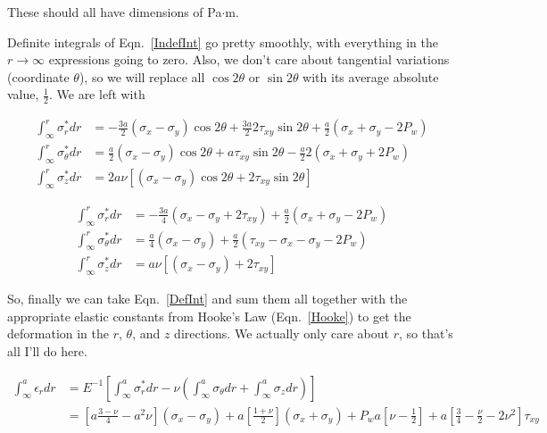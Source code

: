 \documentclass[11pt]{article}
\begin{document}
\noindent These should all have dimensions of Pa$\cdot$m.

Definite integrals of Eqn.~\ref{IndefInt} go pretty smoothly, with everything in the $r\rightarrow\infty$ expressions going to zero.  Also, we don't care about tangential variations (coordinate $\theta$), so we will replace all $\cos2\theta$ or $\sin2\theta$ with its average absolute value, $\frac{1}{2}$.  We are left with

\begin{equation}
	\begin{aligned}
	\int_\infty^r \sigma^*_r dr &= -\frac{3a}{2}\left(\sigma_x-\sigma_y\right)\cos2\theta + \frac{3a}{2}2\tau_{xy}\sin2\theta+\frac{a}{2}\left(\sigma_x+\sigma_y-2P_w\right) \\
	\int_\infty^r \sigma^*_\theta dr &= \frac{a}{2}\left(\sigma_x-\sigma_y\right)\cos2\theta+a\tau_{xy}\sin2\theta-\frac{a}{2}2\left(\sigma_x+\sigma_y+2P_w\right) \\
	\int_\infty^r \sigma^*_z dr &= 2a\nu\left[\left(\sigma_x-\sigma_y\right)\cos2\theta+2\tau_{xy}\sin2\theta\right]
	\end{aligned}
\label{DefInt}
\end{equation}
\fi%

\begin{equation}
	\begin{aligned}
	\int_\infty^r \sigma^*_r dr &= -\frac{3a}{4}\left(\sigma_x-\sigma_y + 2\tau_{xy}\right)+\frac{a}{2}\left(\sigma_x+\sigma_y-2P_w\right) \\
	\int_\infty^r \sigma^*_\theta dr &= \frac{a}{4}\left(\sigma_x-\sigma_y\right)+\frac{a}{2}\left(\tau_{xy}-\sigma_x-\sigma_y-2P_w\right) \\
	\int_\infty^r \sigma^*_z dr &= a\nu\left[\left(\sigma_x-\sigma_y\right)+2\tau_{xy}\right]
	\end{aligned}
\label{DefInt}
\end{equation}

So, finally we can take Eqn.~\ref{DefInt} and sum them all together with the appropriate elastic constants from Hooke's Law (Eqn.~\ref{Hooke}) to get the deformation in the $r$, $\theta$, and $z$ directions.  We actually only care about $r$, so that's all I'll do here.

\begin{equation}
	\begin{aligned}
	\int_\infty^a\epsilon_r dr &= E^{-1}\left[ \int_\infty^a \sigma^*_r dr - \nu\left( \int_\infty^a \sigma_\theta dr + \int_\infty^a \sigma_z dr \right)\right] \\
	&=  \left[ a\frac{3-\nu}{4} - a^2\nu\right]  \left( \sigma_x - \sigma_y \right) + a\left[\frac{1+\nu}{2}\right] \left( \sigma_x + \sigma_y \right) + P_w a\left[\nu-\frac{1}{2}\right]+ a\left[ \frac{3}{4}-\frac{\nu}{2}-2\nu^2\right]\tau_{xy}
	\end{aligned}
\label{DefVec}
\end{equation}
\end{document}
